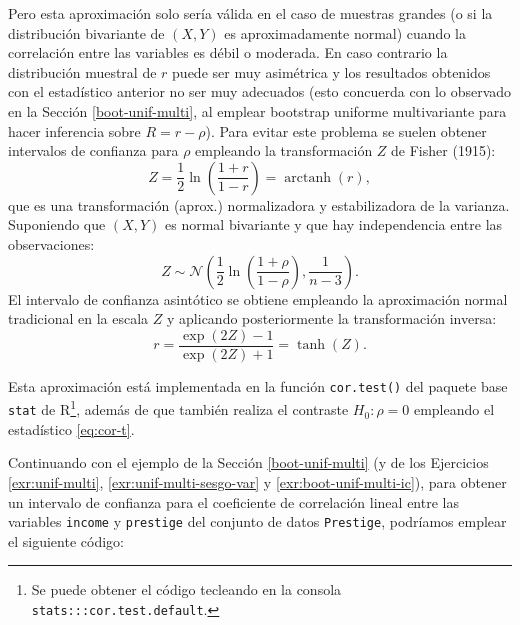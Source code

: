 \documentclass[
  spanish,
  10pt,
]{book}
\newenvironment{Shaded}{\begin{snugshade}}{\end{snugshade}}
\newcommand{\AttributeTok}[1]{\textcolor[rgb]{0.13,0.29,0.53}{#1}}
\newcommand{\CommentTok}[1]{\textcolor[rgb]{0.56,0.35,0.01}{\textit{#1}}}
\newcommand{\FunctionTok}[1]{\textcolor[rgb]{0.13,0.29,0.53}{\textbf{#1}}}
\newcommand{\NormalTok}[1]{#1}
\newcommand{\SpecialCharTok}[1]{\textcolor[rgb]{0.81,0.36,0.00}{\textbf{#1}}}
\newcommand{\StringTok}[1]{\textcolor[rgb]{0.31,0.60,0.02}{#1}}
\theoremstyle{break}
\theoremstyle{nonumberplain}
\renewcommand{\CommentTok}[1]{\textcolor[rgb]{0.41,0.41,0.41}{\texttt{#1}}}
\let\oldfootnote\footnote
\renewcommand\footnote[1]{\oldfootnote{\hspace{2mm}#1}}
\begin{document}
Pero esta aproximación solo sería válida en el caso de muestras grandes (o si la distribución bivariante de \((X, Y)\) es aproximadamente normal) cuando la correlación entre las variables es débil o moderada.
En caso contrario la distribución muestral de \(r\) puede ser muy asimétrica y los resultados obtenidos con el estadístico anterior no ser muy adecuados (esto concuerda con lo observado en la Sección \ref{boot-unif-multi}, al emplear bootstrap uniforme multivariante para hacer inferencia sobre \(R = r -\rho\)).
Para evitar este problema se suelen obtener intervalos de confianza para \(\rho\) empleando la transformación \(Z\) de Fisher (1915):
\[Z = \frac{1}{2}\ln \left( \frac{1+r}{1-r} \right) = \operatorname{arctanh}(r),\]
que es una transformación (aprox.) normalizadora y estabilizadora de la varianza.
Suponiendo que \((X, Y)\) es normal bivariante y que hay independencia entre las observaciones:
\[Z \sim \mathcal{N}\left( \frac{1}{2}\ln \left( \frac{1+\rho}{1-\rho} \right), \frac{1}{n-3} \right).\]
El intervalo de confianza asintótico se obtiene empleando la aproximación normal tradicional en la escala \(Z\) y aplicando posteriormente la transformación inversa:
\[r = \frac{\exp(2Z)-1}{\exp(2Z)+1} = \operatorname{tanh}(Z).\]

Esta aproximación está implementada en la función \texttt{cor.test()} del paquete base \texttt{stat} de R\footnote{Se puede obtener el código tecleando en la consola \texttt{stats:::cor.test.default}.}, además de que también realiza el contraste \(H_0: \rho = 0\) empleando el estadístico \eqref{eq:cor-t}.

Continuando con el ejemplo de la Sección \ref{boot-unif-multi} (y de los Ejercicios \ref{exr:unif-multi}, \ref{exr:unif-multi-sesgo-var} y \ref{exr:boot-unif-multi-ic}), para obtener un intervalo de confianza para el coeficiente de correlación lineal entre las variables \texttt{income} y \texttt{prestige} del conjunto de datos \texttt{Prestige}, podríamos emplear el siguiente código:

\begin{Shaded}
\end{Shaded}
\end{document}

